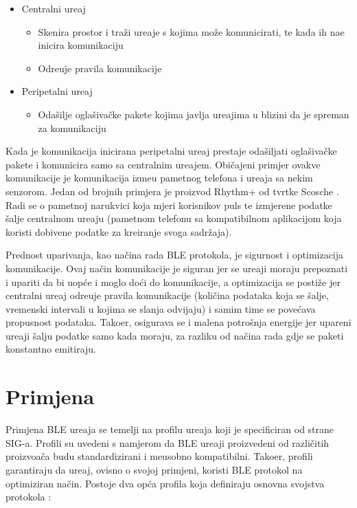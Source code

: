 \begin{itemize}
	\item Centralni ure\dj aj
	\begin{itemize}
		\item Skenira prostor i tra\v{z}i ure\dj aje s kojima mo\v{z}e komunicirati, te kada ih na\dj e inicira komunikaciju
		\item Odre\dj uje pravila komunikacije
	\end{itemize}
	\item Peripetalni ure\dj aj
	\begin{itemize}
		\item Oda\v{s}ilje ogla\v{s}iva\v{c}ke pakete kojima javlja ure\dj ajima u blizini da je spreman za komunikaciju
	\end{itemize}
\end{itemize}

Kada je komunikacija inicirana peripetalni ure\dj aj prestaje oda\v{s}iljati ogla\v{s}iva\v{c}ke pakete i komunicira samo sa centralnim ure\dj ajem. Obi\v{c}ajeni primjer ovakve komunikacije je komunikacija izme\dj u pametnog telefona i ure\dj aja sa nekim senzorom. Jedan od brojnih primjera je proizvod Rhythm+ od tvrtke Scosche \cite{scosche} . Radi se o pametnoj narukvici koja mjeri korisnikov puls te izmjerene podatke \v{s}alje centralnom ure\dj aju (pametnom telefonu sa kompatibilnom aplikacijom koja koristi dobivene podatke za kreiranje svoga sadr\v{z}aja).

Prednost uparivanja, kao na\v{c}ina rada BLE protokola, je sigurnost i optimizacija komunikacije. Ovaj na\v{c}in komunikacije je siguran jer se ure\dj aji moraju prepoznati i upariti da bi uop\'{c}e i moglo do\'{c}i do komunikacije, a optimizacija se posti\v{z}e jer centralni ure\dj aj odre\dj uje pravila komunikacije (koli\v{c}ina podataka koja se \v{s}alje, vremenski intervali u kojima se slanja odvijaju) i samim time se pove\'{c}ava propusnost podataka. Tako\dj er, osigurava se i malena potro\v{s}nja energije jer upareni ure\dj aji \v{s}alju podatke samo kada moraju, za razliku od na\v{c}ina rada gdje se paketi konstantno emitiraju.


\section{Primjena}
Primjena BLE ure\dj aja se temelji na profilu ure\dj aja koji je specificiran od strane SIG-a. Profili su uvedeni s namjerom da BLE ure\dj aji proizvedeni od razli\v{c}itih proizvo\dj a\v{c}a budu standardizirani i me\dj usobno kompatibilni. Tako\dj er, profili garantiraju da ure\dj aj, ovisno o svojoj primjeni, koristi BLE protokol na optimiziran na\v{c}in. Postoje dva op\'{c}a profila koja definiraju osnovna svojstva protokola \cite{ble_getting_started}:

